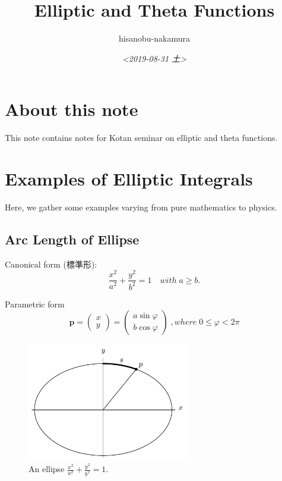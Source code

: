 \documentclass{article}
\author{hisanobu-nakamura}
\date{\textit{<2019-08-31 土>}}
\title{Elliptic and Theta Functions}
\begin{document}
\maketitle
\tableofcontents


\section{About this note}
\label{sec-1}
This note contains notes for Kotan seminar on elliptic and theta functions.

\section{Examples of Elliptic Integrals}
\label{sec-2}
Here, we gather some examples varying from pure mathematics to physics.
\subsection{Arc Length of Ellipse}
\label{sec-2-1}
Canonical form (標準形):
\begin{equation}
\frac{x^{2}}{a^{2}} +\frac{y^{2}}{b^{2}}=1 \quad with \; a \ge b.
\end{equation}

Parametric form
\begin{equation}
\mathbf{p} =\left(
\begin{array}{c}
 x \\
 y
\end{array} \right)
=\left(
\begin{array}{c}
 a \sin{\varphi} \\
 b \cos{\varphi}
\end{array} \right)
\;, where \; 0 \le \varphi < 2 \pi
\end{equation}

\begin{figure}[htb]
\centering
\includegraphics[width=70mm]{./ellipse_generic.png}
\caption{An ellipse $\frac{x^{2}}{a^{2}} +\frac{y^{2}}{b^{2}}=1$.}
\end{figure} \\
\end{document}
